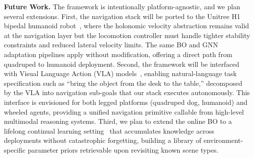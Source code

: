 \documentclass[conference]{IEEEtran}
\begin{document}
\textbf{Future Work.} The framework is intentionally platform-agnostic, and we plan several extensions. First, the navigation stack will be ported to the Unitree H1 bipedal humanoid robot~\cite{@TODO}, where the holonomic velocity abstraction remains valid at the navigation layer but the locomotion controller must handle tighter stability constraints and reduced lateral velocity limits. The same BO and GNN adaptation pipelines apply without modification, offering a direct path from quadruped to humanoid deployment. Second, the framework will be interfaced with Visual Language Action (VLA) models~\cite{@TODO}, enabling natural-language task specification such as ``bring the object from the desk to the table,'' decomposed by the VLA into navigation sub-goals that our stack executes autonomously. This interface is envisioned for both legged platforms (quadruped dog, humanoid) and wheeled agents, providing a unified navigation primitive callable from high-level multimodal reasoning systems. Third, we plan to extend the online BO to a lifelong continual learning setting~\cite{@TODO} that accumulates knowledge across deployments without catastrophic forgetting, building a library of environment-specific parameter priors retrievable upon revisiting known scene types.



\end{document}

